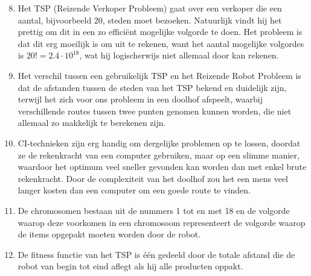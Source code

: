\documentclass[a4paper,10pt,fleqn]{article}
\begin{document}
\begin{enumerate}[1.]
  \setcounter{enumi}{7}

    \item Het TSP (Reizende Verkoper Probleem) gaat over een verkoper die een aantal, bijvoorbeeld 20, steden moet bezoeken. Natuurlijk vindt hij het prettig om dit in een zo efficiënt mogelijke volgorde te doen. Het probleem is dat dit erg moeilijk is om uit te rekenen, want het aantal mogelijke volgordes is $ 20! = 2.4\cdot 10^{18}$, wat hij logischerwijs niet allemaal door kan rekenen.

    \item Het verschil tussen een gebruikelijk TSP en het Reizende Robot Probleem is dat de afstanden tussen de steden van het TSP bekend en duidelijk zijn, terwijl het zich voor ons probleem in een doolhof afspeelt, waarbij verschillende routes tussen twee punten genomen kunnen worden, die niet allemaal zo makkelijk te berekenen zijn.

    \item CI-technieken zijn erg handig om dergelijke problemen op te lossen, doordat ze de rekenkracht van een computer gebruiken, maar op een slimme manier, waardoor het optimum veel sneller gevonden kan worden dan met enkel brute rekenkracht. Door de complexiteit van het doolhof zou het een mens veel langer kosten dan een computer om een goede route te vinden.

    \item De chromosomen bestaan uit de nummers 1 tot en met 18 en de volgorde waarop deze voorkomen in een chromosoom representeert de volgorde waarop de items opgepakt moeten worden door de robot.

    \item De fitness functie van het TSP is één gedeeld door de totale afstand die de robot van begin tot eind aflegt als hij alle producten oppakt.


\end{enumerate}
\end{document}
